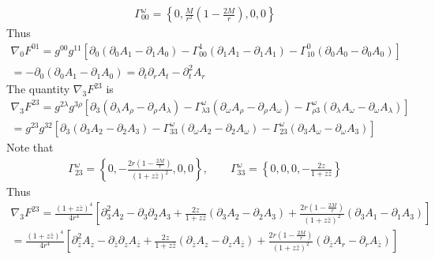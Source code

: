 \documentclass[12pt]{article}
\def\nn{\nonumber}
\begin{document}
\begin{gather}
\Gamma^{\omega}_{00}
=
\left\{
0,\frac{M}{r^{2}} (1 - \frac{2 M}{r}) ,0,0
\right\}
\end{gather}
Thus 
\begin{gather}
\nabla_{0}F^{01}
=
g^{00} g^{11}
\left[
\partial_{0} 
(\partial_{0}A_{1}
-
\partial_{1}A_{0})
-
\Gamma_{00}^{1} 
(\partial_{1} A_{1}
-
\partial_{1} A_{1})
-
\Gamma_{1 0}^{0}
(\partial_{0} A_{0}
-
\partial_{0} A_{0})
\right]
\nn \\
=
-
\partial_{0} 
(\partial_{0}A_{1}
-
\partial_{1}A_{0})
=
\partial_{t}\partial_{r}A_{t}
-
\partial_{t}^{2}A_{r}
\end{gather}
The quantity $\nabla_{3} F^{23}$ is
\begin{gather}
\nabla_{3}F^{23}
=
g^{2 \lambda} g^{3 \rho}
\left[
\partial_{3} 
(\partial_{\lambda}A_{\rho}
-
\partial_{\rho}A_{\lambda})
-
\Gamma_{\lambda 3}^{\omega} 
(\partial_{\omega} A_{\rho}
-
\partial_{\rho} A_{\omega})
-
\Gamma_{\rho 3}^{\omega}
(\partial_{\lambda} A_{\omega}
-
\partial_{\omega} A_{\lambda})
\right]
\nn \\
=
g^{23} g^{32}
\left[
\partial_{3} 
(\partial_{3}A_{2}
-
\partial_{2}A_{3})
-
\Gamma_{33}^{\omega} 
(\partial_{\omega} A_{2}
-
\partial_{2} A_{\omega})
-
\Gamma_{23}^{\omega}
(\partial_{3} A_{\omega}
-
\partial_{\omega} A_{3})
\right]
\end{gather}
Note that
\begin{gather}
\Gamma^{\omega}_{23}
=
\left\{
0,- \frac{2 r (1 - \frac{2 M}{r})}{(1 + z \bar{z})^{2}},0,0
\right\}
,
\qquad
\Gamma^{\omega}_{33}
=
\left\{
0,0,0,-\frac{2 z}{1 + z \bar{z}}
\right\}
\end{gather}
Thus
\begin{gather}
\nabla_{3}F^{23}
=
\frac{(1 + z \bar{z})^{4}}{4 r^{4}}
\left[
\partial_{3}^{2}A_{2}
-
\partial_{3} \partial_{2}A_{3}
+
\frac{2 z}{1 + z \bar{z}}
(\partial_{3} A_{2}
-
\partial_{2} A_{3})
+
\frac{2 r (1 - \frac{2 M}{r})}{(1 + z \bar{z})^{2}}
(\partial_{3} A_{1}
-
\partial_{1} A_{3})
\right]
\nn \\
=
\frac{(1 + z \bar{z})^{4}}{4 r^{4}}
\left[
\partial_{\bar{z}}^{2}A_{z}
-
\partial_{\bar{z}} \partial_{z} A_{\bar{z}}
+
\frac{2 z}{1 + z \bar{z}}
(\partial_{\bar{z}} A_{z}
-
\partial_{z} A_{\bar{z}})
+
\frac{2 r (1 - \frac{2 M}{r})}{(1 + z \bar{z})^{2}}
(\partial_{\bar{z}} A_{r}
-
\partial_{r} A_{\bar{z}})
\right]
\end{gather}
\end{document}
